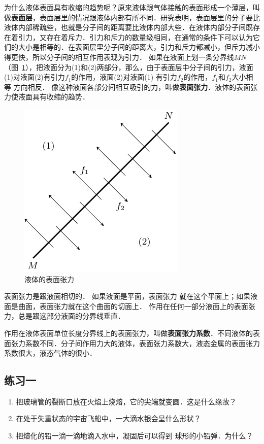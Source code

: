 为什么液体表面具有收缩的趋势呢？原来液体跟气体接触的表面形成一个薄层，叫做\textbf{表面层}，表面层里的情况跟液体内部有所不同．研究表明，表面层里的分子要比液体内部稀疏些，也就是分子间的距离要比液体内部大些．在液体内部分子间既存在着引力，又存在着斥力．引力和斥力的数量级相同，在通常的条件下可以认为它们的大小是相等的．在表面层里分子间的距离大，引力和斥力都减小，但斥力减小得更快，所以分子间的相互作用表现为引力．
如果在液面上划一条分界线$MN$（图~\ref{fig_B_4-11}），把液面分为(1)和(2)两部分，那么，由于表面层中分子间的引力，液面(1)对液面(2)有引力$f_1$的作用，液面(2)对液面(1)
有引力$f_2$的作用，$f_1$和$f_2$大小相等
方向相反．
像这种液面各部分间相互吸引的力，叫做\textbf{表面张力}．液体的表面张力使液面具有收缩的趋势．
\begin{figure}[htbp]
    \centering
    \includegraphics{fig/B/4-11.pdf}
    \caption{液体的表面张力}\label{fig_B_4-11}
\end{figure}

表面张力是跟液面相切的．
如果液面是平面，表面张力
就在这个平面上；如果液面是曲面，表面张力就在这个曲面的切面上．
作用在任何一部分液面上的表面张力，总是跟这部分液面的分界线垂直．

作用在液体表面单位长度分界线上的表面张力，叫做\textbf{表面张力系数}．不同液体的表面张力系数不同．分子间作用力大的液体，表面张力系数大，液态金属的表面张力系数很大，液态气体的很小．

\subsection*{练习一}
\begin{enumerate}
\item 把玻璃管的裂断口放在火焰上烧熔，它的尖端就变圆．这是什么缘故？
\item 在处于失重状态的宇宙飞船中，一大滴水银会呈什么形状？
\item 把熔化的铅一滴一滴地滴入水中，凝固后可以得到
球形的小铅弹．为什么？
\end{enumerate}

